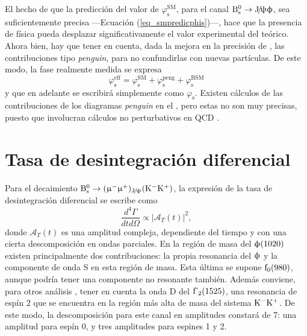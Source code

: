 \color{new}
El hecho de que la predicción del valor de $\varphi_{\text{s}}^{\text{SM}}$, para el canal $\text{B}{}_{\text{s}}^{0} \rightarrow \text{J}\!/\!\uppsi \upphi$, sea suficientemente precisa ---Ecuación (\ref{eq_smpredicphis})---, hace que la presencia de física \bstdmod pueda desplazar significativamente el valor experimental del teórico. Ahora bien, hay que tener en cuenta, dada la mejora en la precisión de \lhcb, las contribuciones tipo \emph{penguin}, para no confundirlas con nuevas partículas. De este modo, la fase realmente medida se expresa
\begin{equation}
\varphi_{\text{s}}^{\text{eff}}  = \varphi_{\text{s}}^{\text{SM}} + \varphi_{\text{s}}^{\text{peng}} + \varphi_{\text{s}}^{\text{BSM}}
\end{equation}
y que en adelante se escribirá simplemente como  $\varphi_{\text{s}}$. Existen cálculos de las contribuciones de los diagramas \emph{penguin} en el \stdmod, pero estas no son muy precisas, puesto que involucran cálculos no perturbativos en QCD \cite{liu2014penguin}.

\color{norm}

\section{Tasa de desintegración diferencial} %
\label{sec_diffrate}

Para el decaimiento \color{vero} $\text{B}{}_{\text{s}}^{0} \rightarrow (\upmu{}^{-} \upmu{}^{+})_{\text{J}\!/\!\uppsi} (\text{K}{}^{-} \text{K}{}^{+})$, \color{norm} la expresión de la tasa de desintegración diferencial se escribe como \cite{liu2014penguin}
\begin{equation}
\frac{d^4\Gamma}{dtd\Omega} \propto |\mathcal{A}_T(t)|^2,	
\end{equation}
donde $\mathcal{A}_T(t)$ es una amplitud compleja, dependiente del tiempo y con una cierta descomposición en ondas parciales. 
%
En la región de masa del $\upphi(1020)$ existen principalmente dos contribuciones: la propia resonancia del $\upphi$ \color{vero} y la componente de onda S en esta región de masa. Esta última se supone $\text{f}_0(980)$, aunque podría tener una componente no resonante también. \color{norm} Además conviene, para otros análisis \cite{Aaij:2017zgz}, tener en cuenta la onda D del $\text{f'}_2(1525)$, una resonancia de espín $2$ que se encuentra en la región más alta de masa del sistema $\text{K}{}^{-}\text{K}{}^{+}$. De este modo, la descomposición para este canal en amplitudes constará de 7: una amplitud para espín 0, y tres amplitudes para espines 1 y 2.

